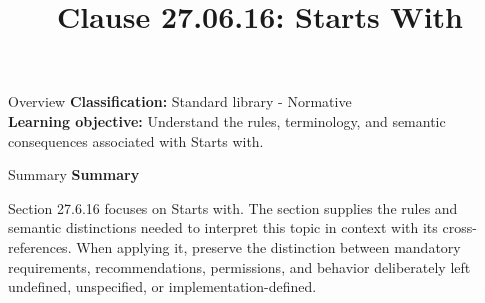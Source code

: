 \documentclass[10pt,letterpaper]{article}
\title{Clause 27.06.16: Starts With}
\author{}
\date{}
\begin{document}
\maketitle
\begin{CornellOverviewBox}{Overview}
\textbf{Classification:} Standard library - Normative\\[2pt]
\textbf{Learning objective:} Understand the rules, terminology, and semantic consequences associated with Starts with.
\end{CornellOverviewBox}\begin{CornellSummaryBox}{Summary}
{\sffamily\bfseries\color{Accent} Summary}\par\vspace{3pt}Section 27.6.16 focuses on Starts with. The section supplies the rules and semantic distinctions needed to interpret this topic in context with its cross-references. When applying it, preserve the distinction between mandatory requirements, recommendations, permissions, and behavior deliberately left undefined, unspecified, or implementation-defined.
\end{CornellSummaryBox}
\end{document}
